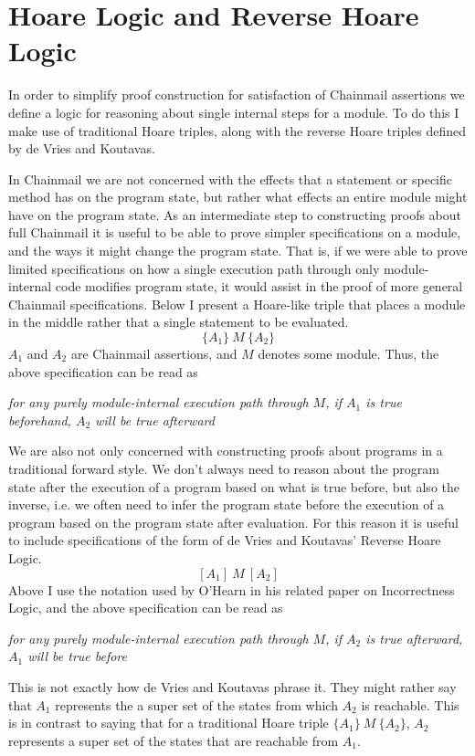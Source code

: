 \documentclass[12pt]{article}
\begin{document}
	


	
	\newpage
	
	\section{Hoare Logic and Reverse Hoare Logic}
	
	In order to simplify proof construction for satisfaction of Chainmail assertions we define a logic for reasoning about single
	internal steps for a module. To do this I make use of traditional Hoare triples, along with the reverse Hoare triples defined by 
	de Vries and Koutavas.
	
	In Chainmail we are not concerned with the effects that a statement or specific method has on the program state, but rather 
	what effects an entire module might have on the program state. As an intermediate step to constructing proofs about full Chainmail
	it is useful to be able to prove simpler specifications on a module, and the ways it might change the program state. That is, if we were able
	to prove limited specifications on how a single execution path through only module-internal code modifies 
	program state, it would assist in the proof of more general Chainmail specifications. Below I present a Hoare-like triple that 
	places a module in the middle rather that a single statement to be evaluated.
	$$\{A_1\}\ M\ \{A_2\}$$
	$A_1$ and $A_2$ are Chainmail assertions, and $M$ denotes some module. Thus, the above specification can be read as
	\begin{displayquote}
	\textit{for any purely module-internal execution path through $M$, if $A_1$ is true beforehand, $A_2$ will be true afterward}
	\end{displayquote}
	
	We are also not only concerned with constructing proofs about
	programs in a traditional forward style. We don't always need to reason about the program state after the execution
	of a program based on what is true before, but also the inverse, i.e. we often need to infer the program state before the 
	execution of a program based on the program state after evaluation. For this reason it is useful to include specifications
	of the form of de Vries and Koutavas' Reverse Hoare Logic.
	$$[A_1]\ M\ [A_2]$$
	Above I use the notation used by O'Hearn in his related paper on Incorrectness Logic, and the above specification can be read as
	\begin{displayquote}
	\textit{for any purely module-internal execution path through $M$, if $A_2$ is true afterward, $A_1$ will be true before}
	\end{displayquote}
	This is not exactly how de Vries and Koutavas phrase it. They might rather say that $A_1$ represents the a super set of the
	states from which $A_2$ is reachable. This is in contrast to saying that for a traditional Hoare triple $\{A_1\}\ M\ \{A_2\}$,
	$A_2$ represents a super set of the states that are reachable from $A_1$.
	
\end{document}
